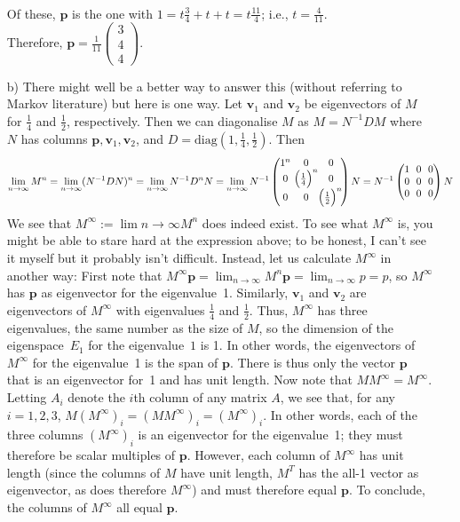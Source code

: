 \documentclass[11pt]{article}
\renewcommand{\vec}[1]{\mathbf{#1}}
\newcommand{\vc}[1]{\begin{pmatrix}#1\end{pmatrix}}
\begin{document}
\begin{itemize}
   \\Of these, $\vec{p}$ is the one with $1 = t\frac{3}{4} + t + t = t\frac{11}{4}$;
    i.e., $t = \frac{4}{11}$.
   \\Therefore, $\vec{p} = \frac{1}{11}\vc{3\\4\\4}$.
  \item[{b)}] There might well be a better way to answer this (without referring to Markov literature)
    but here is one way.
    Let $\vec{v}_1$ and $\vec{v}_2$ be eigenvectors of $M$ for $\frac{1}{4}$ and $\frac{1}{2}$, respectively.
    Then we can diagonalise $M$ as $M = N^{-1}DM$ where $N$ has columns $\vec{p},\vec{v}_1,\vec{v}_2$,
    and $D = \text{diag}(1,\frac{1}{4},\frac{1}{2})$.
    Then
    \[
        \lim_{n\to\infty} M^n
      = \lim_{n\to\infty} (N^{-1}DN)^n
      = \lim_{n\to\infty} N^{-1}D^nN
      = \lim_{n\to\infty} N^{-1}
        \vc{1^n \!&\!       0                  \!&\! 0\\
             0  \!&\!\!\!\Bigl(\frac{1}{4}\Bigr)^n\!\! \!&\! 0\\
             0  \!&\!       0                  \!&\! \!\!\Bigl(\frac{1}{2}\Bigr)^n\!}N
      = N^{-1}
        \vc{1 \!&\! 0 \!&\! 0\\
              0 \!&\! 0 \!&\! 0\\
              0 \!&\! 0 \!&\! 0}N
    \]
    We see that $M^\infty := \lim{n\to \infty} M^n$ does indeed exist.
    To see what $M^\infty$ is, you might be able to stare hard at the expression above;
    to be honest, I can't see it myself but it probably isn't difficult.
    Instead, let us calculate $M^\infty$ in another way:
    First note that $M^\infty \vec{p} = \lim_{n\to\infty}M^n\vec{p} = \lim_{n\to\infty}p = p$,
    so $M^\infty$ has $\vec{p}$ as eigenvector for the eigenvalue~1.
    Similarly, $\vec{v}_1$ and $\vec{v}_2$ are eigenvectors of $M^\infty$ with eigenvalues $\frac{1}{4}$ and $\frac{1}{2}$.
    Thus, $M^\infty$ has three eigenvalues, the same number as the size of $M$,
    so the dimension of the eigenspace~$E_1$ for the eigenvalue~$1$ is 1.
    In other words, the eigenvectors of $M^\infty$ for the eigenvalue~1
    is the span of $\vec{p}$.
    There is thus only the vector $\vec{p}$ that is an eigenvector for~1 and has unit length.
    Now note that $MM^\infty = M^\infty$.
    Letting $A_i$ denote the $i$th column of any matrix $A$,
    we see that, for any $i = 1,2,3$,
    $M(M^\infty)_i  = (MM^\infty)_i = (M^\infty)_i$.
    In other words, each of the three columns $(M^\infty)_i$ is an eigenvector for the eigenvalue~1;
    they must therefore be scalar multiples of $\vec{p}$.
    However, each column of $M^\infty$ has unit length
    (since the columns of $M$ have unit length, $M^T$ has the all-1 vector as eigenvector, as does therefore $M^\infty$)
    and must therefore equal $\vec{p}$.
    To conclude, the columns of $M^\infty$ all equal $\vec{p}$.
\end{itemize}
\end{document}
